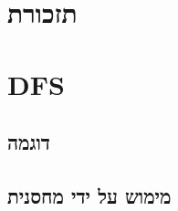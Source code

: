\documentclass[]{article}
\def\insert#1{}
\begin{document}
\def\lecnum{2}
\def\topcis{
חיפוש לעומק -
\textenglish{Depth First Search (DFS)}
}

\section*{תזכורת}
\insert{reminder}
\section*{DFS}
\insert{dfs}
	\subsection*{דוגמה}
	\insert{example1}
	\subsection*{מימוש על ידי מחסנית}
	\insert{stack}
\end{document}
